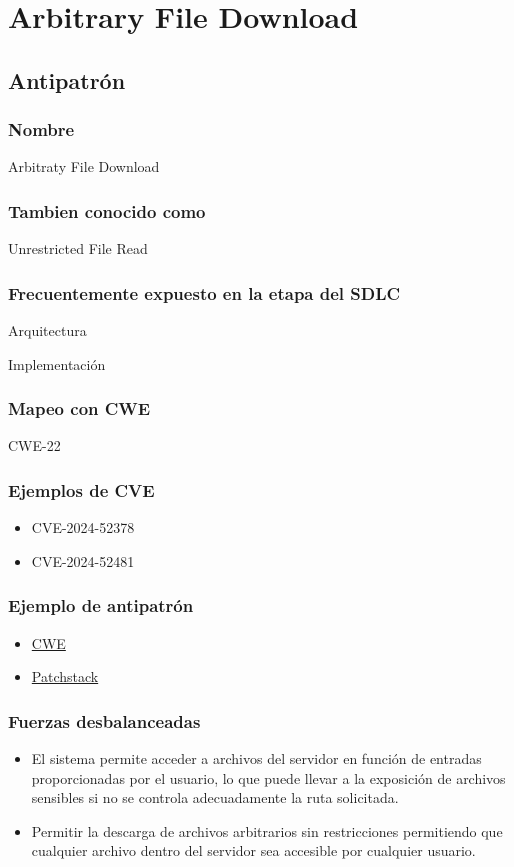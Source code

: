 \chapter{Arbitrary File Download}
\section{Antipatrón}
\subsection{Nombre}
Arbitraty File Download
\subsection{Tambien conocido como}
Unrestricted File Read

\subsection{Frecuentemente expuesto en la etapa del SDLC}
Arquitectura

Implementación
\subsection{Mapeo con CWE}
CWE-22
\subsection{Ejemplos de CVE}
\begin{itemize}
    \item CVE-2024-52378
    \item CVE-2024-52481
\end{itemize}

\subsection{Ejemplo de antipatrón}
\begin{itemize}
    \item \href{https://cwe.mitre.org/data/definitions/22.html}{CWE}
    \item \href{https://patchstack.com/academy/wordpress/vulnerabilities/arbitrary-file-read/}{Patchstack}
\end{itemize}
\subsection{Fuerzas desbalanceadas}

 \begin{itemize}
     \item El sistema permite acceder a archivos del servidor en función de entradas proporcionadas por el usuario, lo que puede llevar a la exposición de archivos sensibles si no se controla adecuadamente la ruta solicitada.
     \item Permitir la descarga de archivos arbitrarios sin restricciones permitiendo que cualquier archivo dentro del servidor sea accesible por cualquier usuario.
 \end{itemize}
 
